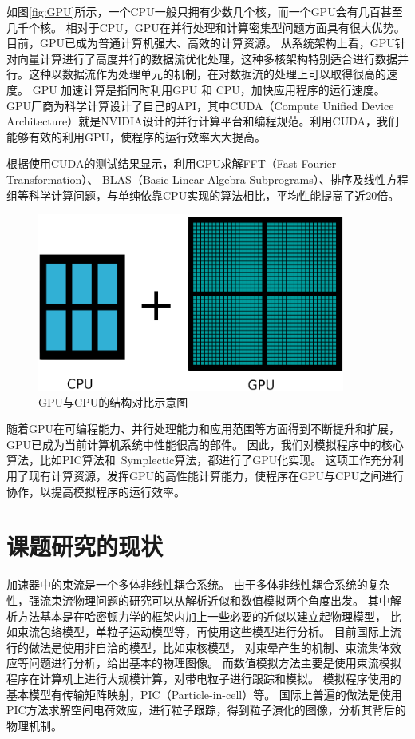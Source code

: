 如图\eqref{fig:GPU}所示，一个CPU一般只拥有少数几个核，而一个GPU会有几百甚至几千个核。
相对于CPU，GPU在并行处理和计算密集型问题方面具有很大优势。目前，GPU已成为普通计算机强大、高效的计算资源。
从系统架构上看，GPU针对向量计算进行了高度并行的数据流优化处理，这种多核架构特别适合进行数据并行。这种以数据流作为处理单元的机制，在对数据流的处理上可以取得很高的速度。
GPU 加速计算是指同时利用GPU 和 CPU，加快应用程序的运行速度\cite{gpu2008}。GPU厂商为科学计算设计了自己的API，其中CUDA（Compute Unified Device Architecture）就是NVIDIA设计的并行计算平台和编程规范\cite{nvidia2010programming}。利用CUDA，我们能够有效的利用GPU，使程序的运行效率大大提高。

根据使用CUDA的测试结果显示，利用GPU求解FFT（Fast Fourier Transformation）、
BLAS（Basic Linear Algebra Subprograms）、排序及线性方程组等科学计算问题，与单纯依靠CPU实现的算法相比，平均性能提高了近20倍。
\begin{figure}[!htb]
    \centering
    \includegraphics[width=0.9\textwidth]{Img/GPU_vs_CPU.png}
    \caption{GPU与CPU的结构对比示意图}
    \label{fig:GPU}
\end{figure}

随着GPU在可编程能力、并行处理能力和应用范围等方面得到不断提升和扩展，GPU已成为当前计算机系统中性能很高的部件。
因此，我们对模拟程序中的核心算法，比如PIC算法和~Symplectic算法，都进行了GPU化实现。
这项工作充分利用了现有计算资源，发挥GPU的高性能计算能力，使程序在GPU与CPU之间进行协作，以提高模拟程序的运行效率。

\section{课题研究的现状}  \label{section:Introduction_now}
加速器中的束流是一个多体非线性耦合系统。
由于多体非线性耦合系统的复杂性，强流束流物理问题的研究可以从解析近似和数值模拟两个角度出发。
其中解析方法基本是在哈密顿力学的框架内加上一些必要的近似以建立起物理模型，
比如束流包络模型，单粒子运动模型等，再使用这些模型进行分析。
目前国际上流行的做法是使用非自洽的模型，比如束核模型，
对束晕产生的机制、束流集体效应等问题进行分析，给出基本的物理图像。
而数值模拟方法主要是使用束流模拟程序在计算机上进行大规模计算，对带电粒子进行跟踪和模拟。
模拟程序使用的基本模型有传输矩阵映射，PIC（Particle-in-cell）等。
国际上普遍的做法是使用PIC方法求解空间电荷效应，进行粒子跟踪，得到粒子演化的图像，分析其背后的物理机制。

